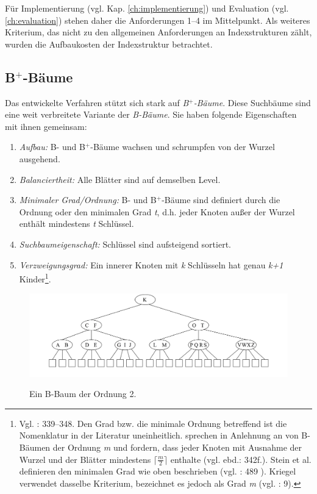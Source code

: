 Für Implementierung (vgl. Kap. \ref{ch:implementierung}) und Evaluation (vgl. \ref{ch:evaluation}) stehen daher die Anforderungen 1--4 im Mittelpunkt. Als weiteres Kriterium, das nicht zu den allgemeinen Anforderungen an Indexstrukturen zählt, wurden die Aufbaukosten der Indexstruktur betrachtet. 
\subsection{B$^+$-Bäume}\label{sec:b+bäume}
Das entwickelte Verfahren stützt sich stark auf \textit{B$^+$-Bäume}. Diese Suchbäume sind eine weit verbreitete Variante der \textit{B-Bäume}. Sie haben folgende Eigenschaften mit ihnen gemeinsam: 
\begin{enumerate}
	\item \textit{Aufbau:} B- und B$^+$-Bäume wachsen und schrumpfen von der Wurzel ausgehend.
	\item \textit{Balanciertheit:} Alle Blätter sind auf demselben Level. 
	\item \textit{Minimaler Grad/Ordnung:} B- und B$^+$-Bäume sind definiert durch die Ordnung oder den minimalen Grad \textit{t}, d.h. jeder Knoten außer der Wurzel enthält mindestens \textit{t} Schlüssel. 
	\item \textit{Suchbaumeigenschaft:} Schlüssel sind aufsteigend sortiert.
	\item \textit{Verzweigungsgrad:} Ein innerer Knoten mit \textit{k} Schlüsseln hat genau \textit{k+1} Kinder\footnote{Vgl. \cite{Ottmann2012}: 339--348. Den Grad bzw. die minimale Ordnung betreffend ist die Nomenklatur in der Literatur uneinheitlich. \cite{Ottmann2012} sprechen in Anlehnung an \cite{Knuth1998}	 von B-Bäumen der Ordnung \textit{m} und fordern, dass jeder Knoten mit Ausnahme der Wurzel und der Blätter mindestens $\lceil\frac{m}{2}\rceil$ enthalte (vgl. ebd.: 342f.). Stein et al. definieren den minimalen Grad wie oben beschrieben (vgl. \cite{Stein2009}:  489
). Kriegel verwendet dasselbe Kriterium, bezeichnet es jedoch als Grad \textit{m} (vgl. \cite{Kriegel1994--2013}: 9).}.
\end{enumerate} 
\begin{figure}[hpbt]
  \centering
  \includegraphics[width=1.0\textwidth]{pictures/b-baum.png}\\
  \caption[Ein B-Baum der Ordnung 2, Bildnachweis: \cite{Kriegel1994-2013}: 9.]{Ein B-Baum der Ordnung 2.}\label{fig:pic3}
\end{figure}
